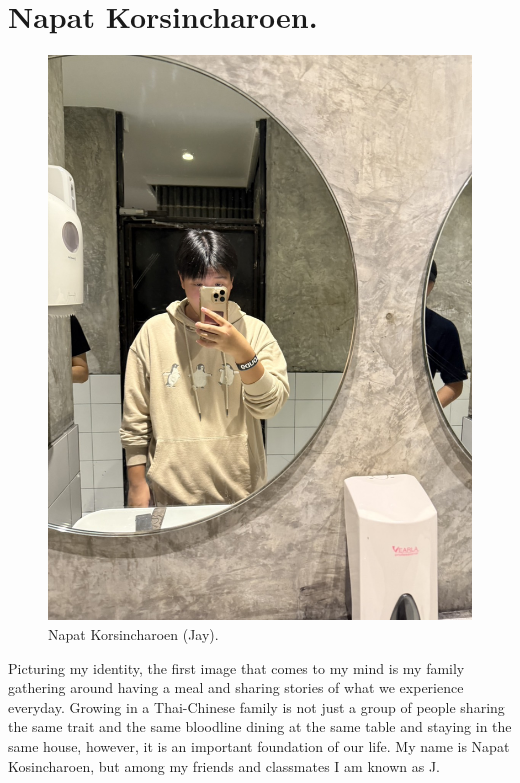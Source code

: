 \documentclass[11pt]{book}
\begin{document}

		\chapter{Napat Korsincharoen.}
				\begin{figure}[H]
							\begin{center}
  							\includegraphics[scale=0.125]{Photos/Napat_Korsincharoen.jpg}
  							\end{center}
 							\caption{Napat Korsincharoen (Jay).}
				\end{figure}
		
Picturing my identity, the first image that comes to my mind is my family gathering around having a meal and sharing stories of what we experience everyday. Growing in a Thai-Chinese family is not just a group of people sharing the same trait and the same bloodline dining at the same table and staying in the same house, however, it is an important foundation of our life. My name is Napat Kosincharoen, but among my friends and classmates I am known as J. 
\end{document}
